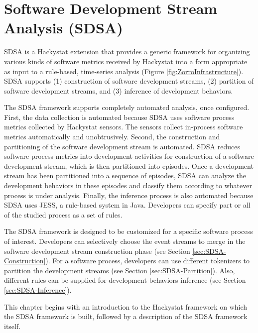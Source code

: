 \chapter{Software Development Stream Analysis (SDSA)}
\label{ch:Framework}

SDSA is a Hackystat extension that provides a generic framework for 
organizing various kinds of software metrics received by Hackystat 
into a form appropriate as input to a rule-based, time-series analysis 
(Figure \ref{fig:ZorroInfrastructure}). SDSA supports (1) construction 
of software development streams, (2) partition of software development 
streams, and (3) inference of development behaviors. 

The SDSA framework supports completely automated analysis, once configured.
First, the data collection is automated because SDSA uses software process 
metrics collected by Hackystat sensors. The sensors collect in-process software 
metrics automatically and unobtrusively. Second, the construction and 
partitioning of the software development stream is automated. SDSA reduces 
software process metrics into development activities for construction of a 
software development stream, which is then partitioned into episodes. Once 
a development stream has been partitioned into a sequence of episodes, 
SDSA can analyze the development behaviors in these episodes and classify 
them according to whatever process is under analysis. Finally, the inference 
process is also automated because SDSA uses JESS\cite{Friedman-Hill:03}, 
a rule-based system in Java. Developers can specify part or all of the 
studied process as a set of rules. 

The SDSA framework is designed to be customized for a specific software 
process of interest. Developers can selectively choose the event streams
to merge in the software development stream construction phase (see Section
\ref{sec:SDSA-Construction}). For a software process, developers can 
use different tokenizers to partition the development streams (see Section 
\ref{sec:SDSA-Partition}). Also, different rules can be supplied for 
development behaviors inference (see Section \ref{sec:SDSA-Inference}). 

This chapter begins with an introduction to the Hackystat framework
on which the SDSA framework is built, followed by a description
of the SDSA framework itself. 


